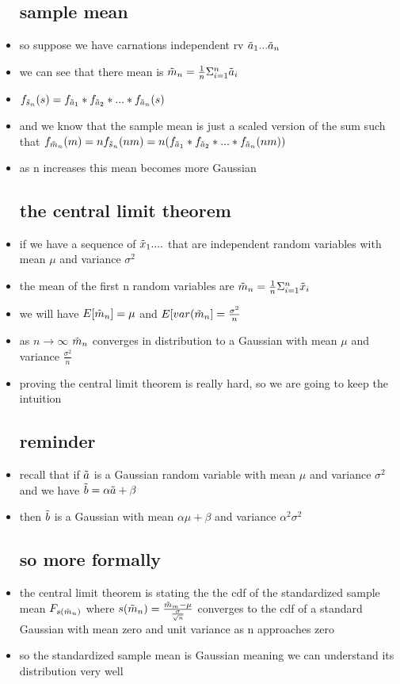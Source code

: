 \documentclass{article}
\begin{document}
\begin{itemize}
\subsection{sample mean }
\item so suppose we have carnations independent rv $\Tilde{a}_1...\Tilde{a}_n$
\item we can see that there mean is $\Tilde{m}_n=\frac{1}{n}\Sigma_{i=1}^n\Tilde{a}_i$
\item $f_{\Tilde{s}_{n}}(s)=f_{\Tilde{a}_1}*f_{\Tilde{a}_2}*...*f_{\Tilde{a}_n}(s)$ 
\item and we know that the sample mean is just a scaled version of the sum such that $f_{\Tilde{m}_{n}}(m)=nf_{\Tilde{s}_{n}}(nm)=n(f_{\Tilde{a}_1}*f_{\Tilde{a}_2}*...*f_{\Tilde{a}_n}(nm))$
\item as n increases this mean becomes more Gaussian 
\subsection{the central limit theorem}
\item if we have a sequence of $\Tilde{x}_1....$ that are independent random variables with mean $\mu$ and variance $\sigma^2$ 
\item the mean of the first n random variables are $\Tilde{m}_{n}=\frac{1}{n}\Sigma_{i=1}^{n}\Tilde{x}_{i}$
\item we will have $E[\Tilde{m}_{n}]=\mu$ and $E[var(\Tilde{m}_{n}]=\frac{\sigma^2}{n}$
\item as $n\rightarrow \infty$ $\Tilde{m}_{n}$ converges in distribution to a Gaussian with mean $\mu$ and variance $\frac{\sigma^2}{n}$ 
\item proving the central limit theorem is really hard, so we are going to keep the intuition
\subsection{reminder}
\item recall that if $\Tilde{a}$ is a Gaussian random variable with mean $\mu$ and variance $\sigma^2$ and we have $\Tilde{b}=\alpha \Tilde{a}+\beta$
\item then $\Tilde{b}$ is a Gaussian with mean $\alpha \mu +\beta$ and variance $\alpha^2\sigma^2$
\subsection{so more formally}
\item the central limit theorem is stating the the cdf of the standardized sample mean $F_{s(\Tilde{m}_n)}$ where $s(\Tilde{m}_n)=\frac{\Tilde{m}_{m}-\mu}{\frac{\sigma}{\sqrt{n}}}$ converges to the cdf of a standard Gaussian with mean  zero and unit variance as n approaches zero
\item so the standardized sample mean is Gaussian meaning we can understand its distribution very well

\end{itemize}
\end{document}
